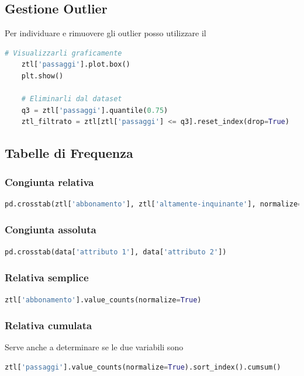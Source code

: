 \documentclass{article}
\begin{document}
\subsection*{Gestione Outlier}

Per individuare e rimuovere gli outlier posso utilizzare il 

\begin{lstlisting}[language=Python]
    # Visualizzarli graficamente
    ztl['passaggi'].plot.box()
    plt.show()

    # Eliminarli dal dataset
    q3 = ztl['passaggi'].quantile(0.75)
    ztl_filtrato = ztl[ztl['passaggi'] <= q3].reset_index(drop=True)
\end{lstlisting}

\subsection*{Tabelle di Frequenza}

\subsubsection*{Congiunta relativa}
\begin{lstlisting}[language=Python]
pd.crosstab(ztl['abbonamento'], ztl['altamente-inquinante'], normalize=True)
\end{lstlisting}

\subsubsection*{Congiunta assoluta}
\begin{lstlisting}[language=Python]
    pd.crosstab(data['attributo 1'], data['attributo 2'])
\end{lstlisting}

\subsubsection*{Relativa semplice}
\begin{lstlisting}[language=Python]
ztl['abbonamento'].value_counts(normalize=True)
\end{lstlisting}

\subsubsection*{Relativa cumulata}

Serve anche a determinare se le due variabili sono 
\begin{lstlisting}[language=Python]
ztl['passaggi'].value_counts(normalize=True).sort_index().cumsum()
\end{lstlisting}
\end{document}

